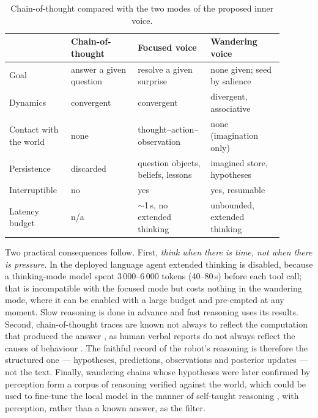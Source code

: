 \begin{table}[ht]
    \centering
    \small
    \begin{tabular}{|>{\raggedright\arraybackslash}p{0.19\linewidth}|>{\raggedright\arraybackslash}p{0.22\linewidth}|>{\raggedright\arraybackslash}p{0.24\linewidth}|>{\raggedright\arraybackslash}p{0.24\linewidth}|}
        \hline
                                & \textbf{Chain-of-thought} & \textbf{Focused voice} & \textbf{Wandering voice} \\ \hline
        Goal                    & answer a given question   & resolve a given surprise & none given; seed by salience \\ \hline
        Dynamics                & convergent                & convergent             & divergent, associative \\ \hline
        Contact with the world  & none                      & thought--action--observation & none (imagination only) \\ \hline
        Persistence             & discarded                 & question objects, beliefs, lessons & imagined store, hypotheses \\ \hline
        Interruptible           & no                        & yes                    & yes, resumable \\ \hline
        Latency budget          & n/a                       & $\sim$1\,s, no extended thinking & unbounded, extended thinking \\ \hline
    \end{tabular}
    \caption{Chain-of-thought compared with the two modes of the proposed inner voice.}
    \label{tab:inner_cot}
\end{table}

Two practical consequences follow. First, \emph{think when there is time, not when there is pressure}. In the
deployed language agent extended thinking is disabled, because a thinking-mode model spent 3\,000--6\,000 tokens
(40--80\,s) before each tool call; that is incompatible with the focused mode but costs nothing in the wandering
mode, where it can be enabled with a large budget and pre-empted at any moment. Slow reasoning is done in advance
and fast reasoning uses its results. Second, chain-of-thought traces are known not always to reflect the
computation that produced the answer \cite{turpin2023language}, as human verbal reports do not always reflect the
causes of behaviour \cite{nisbett1977telling}. The faithful record of the robot's reasoning is therefore the
structured one --- hypotheses, predictions, observations and posterior updates --- not the text. Finally, wandering
chains whose hypotheses were later confirmed by perception form a corpus of reasoning verified against the world,
which could be used to fine-tune the local model in the manner of self-taught reasoning \cite{zelikman2022star},
with perception, rather than a known answer, as the filter.

